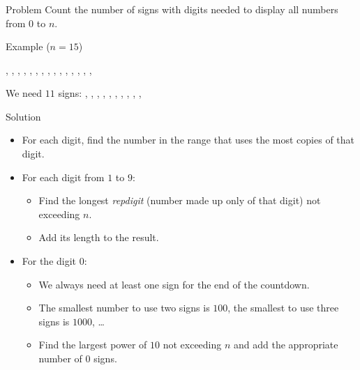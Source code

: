 \begin{frame}
  \frametitle{\problemtitle}
  \begin{block}{Problem}
    Count the number of signs with digits needed to display all numbers from $0$ to $n$.
  \end{block}
  \begin{block}{Example ($n=15$)}
    \begin{center}
      , , , , , , , , , , , , , , , 
    \end{center}
    \vspace{-2mm}
    We need $11$ signs: , , , , , , , , , , 
  \end{block}
  \pause
  \begin{block}{Solution}
    \begin{itemize}
      \item<+-> For each digit, find the number in the range that uses the most copies of that digit.
      \item<+-> For each digit from $1$ to $9$:
        \begin{itemize}
          \item Find the longest \emph{repdigit} (number made up only of that digit) not exceeding $n$.
          \item Add its length to the result.
        \end{itemize}
      \item<+-> For the digit $0$:
        \begin{itemize}
          \item We always need at least one sign for the end of the countdown.
          \item The smallest number to use two signs is $100$, the smallest to use three signs is $1000$, \dots
          \item Find the largest power of $10$ not exceeding $n$ and add the appropriate number of $0$ signs.
        \end{itemize}
    \end{itemize}
  \end{block}
\end{frame}
